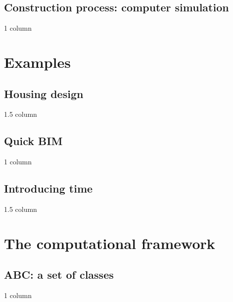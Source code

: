 \documentclass[11pt,oneside]{article}	%
\begin{document}
\subsection{Construction process: computer simulation}
1 column
\section{Examples}
\subsection{Housing design}
1.5 column
\subsection{Quick BIM}
1 column
\subsection{Introducing time}
1.5 column
\section{The computational framework}
\subsection{ABC: a set of classes}
1 column
\end{document}
